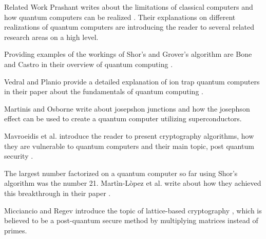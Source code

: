\documentclass[aps,preprintnumbers,twocolumn]{revtex4}
\begin{document}
\begin{section}{Related Work}
Prashant writes about the limitations of classical computers and how quantum computers can be realized \cite{prashant}. 
Their explanations on different realizations of quantum computers are introducing the reader to several related research areas on a high level. 

Providing examples of the workings of Shor's and Grover's algorithm are Bone and Castro in their overview of quantum computing \cite{Bone}. 

Vedral and Planio provide a detailed explanation of ion trap quantum computers in their paper about the fundamentals of quantum computing \cite{2008}.

Martinis and Osborne write about josepshon junctions \cite{martinis} and how the josephson effect can be used to create a quantum computer utilizing superconductors.

Mavroeidis et al. introduce the reader to present cryptography algorithms, how they are vulnerable to quantum computers and their main topic, post quantum security \cite{DBLP:journals/corr/abs-1804-00200}. 

The largest number factorized on a quantum computer so far using Shor's algorithm was the number 21. Martìn-Lòpez et al. write about how they achieved this breakthrough in their paper \cite{article}.

Micciancio and Regev introduce the topic of lattice-based cryptography \cite{Micciancio2009}, which is believed to be a post-quantum secure method by multiplying matrices instead of primes.

\end{section}
\end{document}
